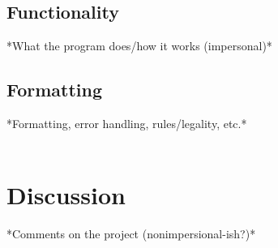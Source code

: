 \documentclass{article}
\begin{document}
		\subsection{Functionality}
			*What the program does/how it works (impersonal)*
		\subsection{Formatting}
			*Formatting, error handling, rules/legality, etc.*
	\\ \\
	\section{Discussion}
		*Comments on the project (nonimpersional-ish?)*
	
	
	\clearpage
	
	
	
\end{document}
